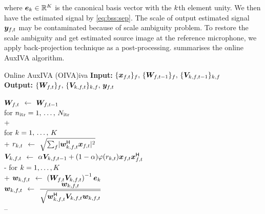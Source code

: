 \documentclass[sip,biber]{now-journal}
\begin{document}
where $\bm{e} _{k} \in \mathbb{R} ^{K}$ is the canonical basis vector with the $k$th element unity.
We then have the estimated signal by \eqref{eq:bss:sep}.
The scale of output estimated signal $\Est _{\ft}$ may be contaminated because of scale ambiguity problem.
To restore the scale ambiguity and get estimated source image at the reference microphone,
we apply back-projection technique \cite{Murata:2001:NC} as a post-processing.
 summarises the online AuxIVA algorithm.
\begin{algorithm}{Online AuxIVA (OIVA)}{iva}
  \textbf{Input:} $\{\Obs _{\ft}\} _{\freq},\, \{\Demix _{\ft[-1]}\}_{\freq},\, \{\cov _{\src,\ft[-1]}\}_{\src,\freq}$\\
  \textbf{Output:} $\{\Demix _{\ft}\}_{\freq},\, \{\cov _{\src,\ft}\}_{\src,\freq},\, \Est _{\ft}$
  \begin{pseudo}
    {$\Demix _{\ft}$} $\gets$ $\Demix _{\ft[-1]}$ \ct{$(\forall \freq)$} \\
    for $n _{\mathrm{itr}} = 1,\, \dots,\, N _{\mathrm{itr}}$ \\+
       \\
      for $k = 1,\, \dots,\, K$ \\+
        {$r _{k,t}$} $\gets$ $\sqrt{\sum _{\freq} \abs{\demix _{\src,\ft} ^{\hermite} \Obs _{\ft}} ^2}$ \\
        {$\cov _{\src,\ft}    $} $\gets$ $\forget \cov _{\src,\ft[-1]} + (1 - \forget) \weight(\var _{\src,\tframe}) \Obs _{\ft} \Obs _{\ft} ^{\hermite}$ \ct{$(\forall \freq)$}\\-
      for $k = 1, \dots, K$ \\+
        {$\demix _{\src,\ft}$} $\gets$ $\left(\Demix _{\ft} \cov _{\src,\ft}\right) ^{-1} \eye _{\src}$ \ct{$(\forall \freq)$}\\
        {$\demix _{\src,\ft}$} $\gets$ $\dfrac{\demix _{\src,\ft}}{\sqrt{\demix _{\src,\ft} ^{\hermite} \cov _{\src,\ft} \demix _{\src,\ft}}}$ \ct{$(\forall \freq)$}\\--
         \\
\end{pseudo}
\end{algorithm}
\end{document}
